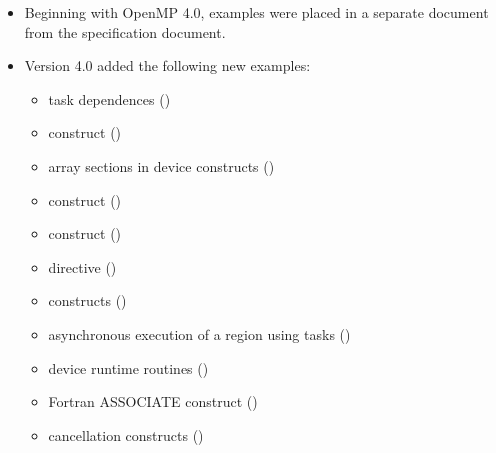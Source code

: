 \begin{itemize}
\item Beginning with OpenMP 4.0, examples were placed in a separate document
      from the specification document.
\item Version 4.0 added the following new examples:

\begin{itemize}
\item task dependences                       ()
\item {} construct                ()
\item array sections in device constructs    ()
\item {} construct    ()
\item {} construct  ()
\item {} directive ()
\item {} constructs                ()
\item asynchronous execution of a  region using tasks ()
\item device runtime routines                ()
\item Fortran ASSOCIATE construct            ()
\item cancellation constructs                ()
\end{itemize}

\end{itemize}
